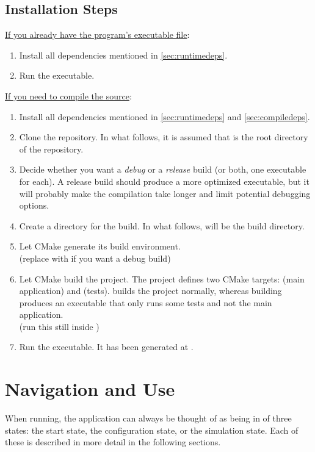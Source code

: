 \documentclass[11pt,a4paper,twoside,openright]{report}
\begin{document}
\subsection{Installation Steps}
\underline{If you already have the program's executable file}:
\begin{enumerate}
	\item
		Install all dependencies mentioned in \ref{sec:runtimedeps}.
	\item
		Run the executable.
\end{enumerate}
\underline{If you need to compile the source}:
\begin{enumerate}
	\item
		Install all dependencies mentioned in \ref{sec:runtimedeps} and \ref{sec:compiledeps}.
	\item
		Clone the repository. In what follows, it is assumed that  is the root directory of the repository.
	\item
		Decide whether you want a \emph{debug} or a \emph{release} build (or both, one executable for each). A release build should produce a more optimized executable, but it will probably make the compilation take longer and limit potential debugging options.
	\item
		Create a directory for the build. In what follows,  will be the build directory.
	\item
		Let CMake generate its build environment.
		\\
		(replace  with  if you want a debug build)
	\item
		Let CMake build the project. The project defines two CMake targets:  (main application) and  (tests).  builds the project normally, whereas building  produces an executable that only runs some tests and not the main application.
		\\
		(run this still inside )
	\item
		Run the executable. It has been generated at .
\end{enumerate}

\section{Navigation and Use}
When running, the application can always be thought of as being in of three states: the start state, the configuration state, or the simulation state. Each of these is described in more detail in the following sections.
\end{document}
